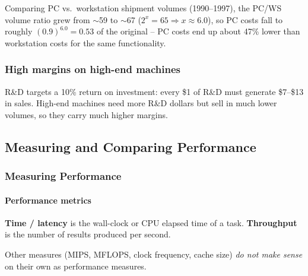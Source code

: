 \begin{eg}
Comparing PC vs.\ workstation shipment volumes (1990--1997), the PC/WS
volume ratio grew from $\sim$59 to $\sim$67 ($2^x = 65 \Rightarrow x
\approx 6.0$), so PC costs fall to roughly $(0.9)^{6.0} = 0.53$ of the
original -- PC costs end up about 47\% lower than workstation costs for the
same functionality.
\end{eg}

\subsubsection{High margins on high-end machines}
R\&D targets a 10\% return on investment: every \$1 of R\&D must generate
\$7--\$13 in sales. High-end machines need more R\&D dollars but sell in
much lower volumes, so they carry much higher margins.

\subsection{Measuring and Comparing Performance}
\label{sec:performance}

\subsubsection{Measuring Performance}
\label{sec:measuring-performance}

\paragraph{Performance metrics}
\begin{definition}
\textbf{Time / latency} is the wall-clock or CPU elapsed time of a task.
\textbf{Throughput} is the number of results produced per second.
\end{definition}
\begin{remark}
Other measures (MIPS, MFLOPS, clock frequency, cache size) \emph{do not make
sense} on their own as performance measures.
\end{remark}

